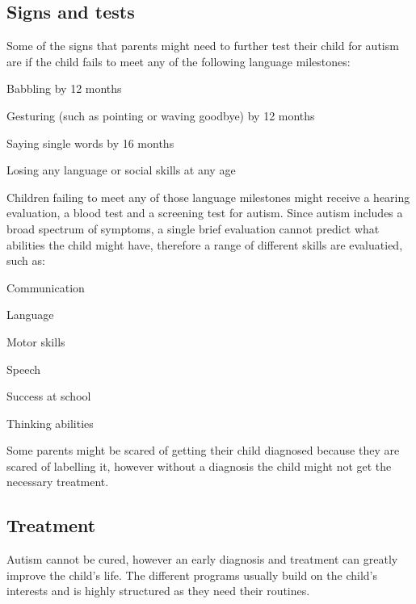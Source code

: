 \subsection*{Signs and tests}

Some of the signs that parents might need to further test their child for autism are if the child fails to meet any of the following language milestones:

\begin{description}
\item Babbling by 12 months
\item Gesturing (such as pointing or waving goodbye) by 12 months
\item Saying single words by 16 months
\item Losing any language or social skills at any age
\end{description}

Children failing to meet any of those language milestones might receive a hearing evaluation, a blood test and a screening test for autism. Since autism includes a broad spectrum of symptoms, a single brief evaluation cannot predict what abilities the child might have, therefore a range of different skills are evaluatied, such as:

\begin{description}
\item Communication
\item Language
\item Motor skills
\item Speech
\item Success at school
\item Thinking abilities
\end{description}

Some parents might be scared of getting their child diagnosed because they are scared of labelling it, however without a diagnosis the child might not get the necessary treatment. 

\subsection*{Treatment}

Autism cannot be cured, however an early diagnosis and treatment can greatly improve the child's life. The different programs usually build on the child's interests and is highly structured as they need their routines. 
